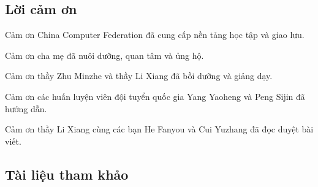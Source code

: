 \documentclass[11pt]{article}
\begin{document}
\subsection*{Lời cảm ơn}

Cảm ơn China Computer Federation đã cung cấp nền tảng học tập và giao lưu.

Cảm ơn cha mẹ đã nuôi dưỡng, quan tâm và ủng hộ.

Cảm ơn thầy Zhu Minzhe và thầy Li Xiang đã bồi dưỡng và giảng dạy.

Cảm ơn các huấn luyện viên đội tuyển quốc gia Yang Yaoheng và Peng Sijin đã
hướng dẫn.

Cảm ơn thầy Li Xiang cùng các bạn He Fanyou và Cui Yuzhang đã đọc duyệt bài
viết.

\subsection*{Tài liệu tham khảo}
\end{document}
